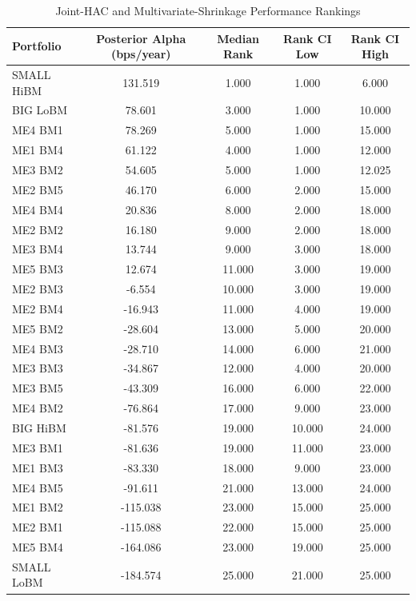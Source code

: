 \begin{table}
\caption{Joint-HAC and Multivariate-Shrinkage Performance Rankings}
\label{tab:performance_rankings}
\begin{tabular}{lcccc}
\toprule
Portfolio & Posterior Alpha (bps/year) & Median Rank & Rank CI Low & Rank CI High \\
\midrule
SMALL HiBM & 131.519 & 1.000 & 1.000 & 6.000 \\
BIG LoBM & 78.601 & 3.000 & 1.000 & 10.000 \\
ME4 BM1 & 78.269 & 5.000 & 1.000 & 15.000 \\
ME1 BM4 & 61.122 & 4.000 & 1.000 & 12.000 \\
ME3 BM2 & 54.605 & 5.000 & 1.000 & 12.025 \\
ME2 BM5 & 46.170 & 6.000 & 2.000 & 15.000 \\
ME4 BM4 & 20.836 & 8.000 & 2.000 & 18.000 \\
ME2 BM2 & 16.180 & 9.000 & 2.000 & 18.000 \\
ME3 BM4 & 13.744 & 9.000 & 3.000 & 18.000 \\
ME5 BM3 & 12.674 & 11.000 & 3.000 & 19.000 \\
ME2 BM3 & -6.554 & 10.000 & 3.000 & 19.000 \\
ME2 BM4 & -16.943 & 11.000 & 4.000 & 19.000 \\
ME5 BM2 & -28.604 & 13.000 & 5.000 & 20.000 \\
ME4 BM3 & -28.710 & 14.000 & 6.000 & 21.000 \\
ME3 BM3 & -34.867 & 12.000 & 4.000 & 20.000 \\
ME3 BM5 & -43.309 & 16.000 & 6.000 & 22.000 \\
ME4 BM2 & -76.864 & 17.000 & 9.000 & 23.000 \\
BIG HiBM & -81.576 & 19.000 & 10.000 & 24.000 \\
ME3 BM1 & -81.636 & 19.000 & 11.000 & 23.000 \\
ME1 BM3 & -83.330 & 18.000 & 9.000 & 23.000 \\
ME4 BM5 & -91.611 & 21.000 & 13.000 & 24.000 \\
ME1 BM2 & -115.038 & 23.000 & 15.000 & 25.000 \\
ME2 BM1 & -115.088 & 22.000 & 15.000 & 25.000 \\
ME5 BM4 & -164.086 & 23.000 & 19.000 & 25.000 \\
SMALL LoBM & -184.574 & 25.000 & 21.000 & 25.000 \\
\bottomrule
\end{tabular}
\end{table}
